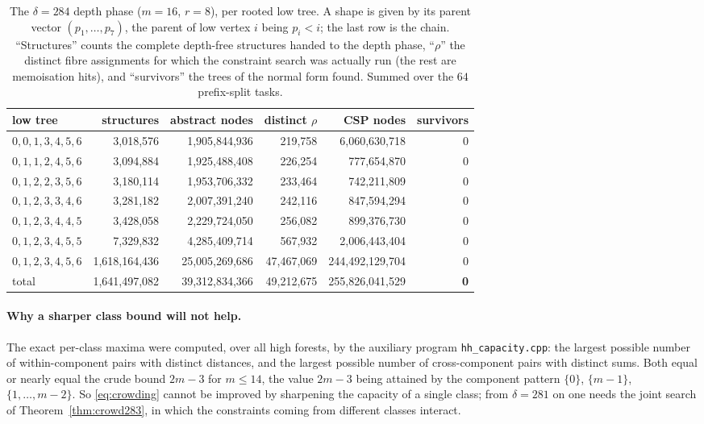 \documentclass[11pt,a4paper]{article}
\theoremstyle{plain}
\theoremstyle{remark}
\newcommand{\file}[1]{\texttt{#1}}
\begin{document}
\begin{table}[ht]
\centering
\caption{The $\delta=284$ depth phase ($m=16$, $r=8$), per rooted low tree.  A
shape is given by its parent vector $(p_1,\dots,p_7)$, the parent of low vertex
$i$ being $p_i<i$; the last row is the chain.  ``Structures'' counts the
complete depth-free structures handed to the depth phase, ``$\rho$'' the
distinct fibre assignments for which the constraint search was actually run
(the rest are memoisation hits), and ``survivors'' the trees of the normal form
found.  Summed over the $64$ prefix-split tasks.}
\label{tab:crowd284}
\small
\setlength{\tabcolsep}{5pt}
\begin{tabular}{@{}lrrrrr@{}}
\toprule
low tree & structures & abstract nodes & distinct $\rho$ & CSP nodes & survivors\\
\midrule
$0,0,1,3,4,5,6$ & 3,018,576 & 1,905,844,936 & 219,758 & 6,060,630,718 & 0\\
$0,1,1,2,4,5,6$ & 3,094,884 & 1,925,488,408 & 226,254 & 777,654,870 & 0\\
$0,1,2,2,3,5,6$ & 3,180,114 & 1,953,706,332 & 233,464 & 742,211,809 & 0\\
$0,1,2,3,3,4,6$ & 3,281,182 & 2,007,391,240 & 242,116 & 847,594,294 & 0\\
$0,1,2,3,4,4,5$ & 3,428,058 & 2,229,724,050 & 256,082 & 899,376,730 & 0\\
$0,1,2,3,4,5,5$ & 7,329,832 & 4,285,409,714 & 567,932 & 2,006,443,404 & 0\\
$0,1,2,3,4,5,6$ & 1,618,164,436 & 25,005,269,686 & 47,467,069 & 244,492,129,704 & 0\\
\midrule
total & 1,641,497,082 & 39,312,834,366 & 49,212,675 & 255,826,041,529 & \textbf{0}\\
\bottomrule
\end{tabular}
\end{table}

\paragraph{Why a sharper class bound will not help.}
The exact per-class maxima were computed, over all high forests, by the
auxiliary program \file{hh\_capacity.cpp}: the largest possible number of
within-component pairs with distinct distances, and the largest possible number
of cross-component pairs with distinct sums.  Both
equal or nearly equal the crude bound $2m-3$ for $m\le14$, the value $2m-3$
being attained by the component pattern $\{0\}$, $\{m-1\}$,
$\{1,\dots,m-2\}$.  So
\eqref{eq:crowding} cannot be improved by sharpening the capacity of a single
class; from $\delta=281$ on one needs the joint search of
Theorem~\ref{thm:crowd283}, in which the constraints coming from different
classes interact.
\end{document}
